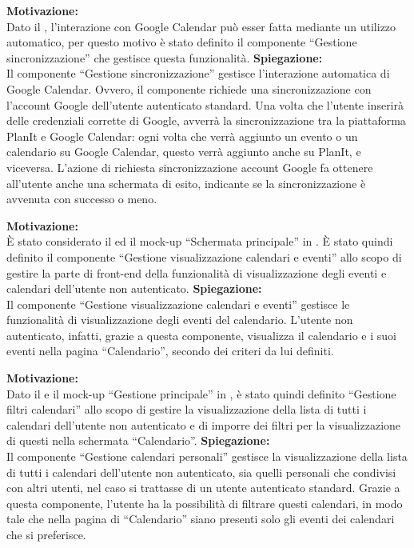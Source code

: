 \begin{listaPersonale}[ACI]{}
    \textbf{Motivazione:}\\
    Dato il , l'interazione con Google Calendar può esser fatta mediante un utilizzo automatico, per questo motivo è stato definito il componente “Gestione sincronizzazione” che gestisce questa funzionalità.
    \textbf{Spiegazione:}\\
    Il componente “Gestione sincronizzazione” gestisce l'interazione automatica di Google Calendar. Ovvero, il componente richiede una sincronizzazione con l'account Google dell'utente autenticato standard. Una volta che l'utente inserirà delle credenziali corrette di Google, avverrà la sincronizzazione tra la piattaforma PlanIt e Google Calendar: ogni volta che verrà aggiunto un evento o un calendario su Google Calendar, questo verrà aggiunto anche su PlanIt, e viceversa. L'azione di richiesta sincronizzazione account Google fa ottenere all'utente anche una schermata di esito, indicante se la sincronizzazione è avvenuta con successo o meno.



    \textbf{Motivazione:}\\
    È stato considerato il  ed il mock-up  “Schermata principale” in .
    È stato quindi definito il componente “Gestione visualizzazione calendari e eventi” allo scopo di gestire la parte di front-end della funzionalità di visualizzazione degli eventi e calendari dell'utente non autenticato.
    \textbf{Spiegazione:}\\
    Il componente “Gestione visualizzazione calendari e eventi” gestisce le funzionalità di visualizzazione degli eventi del calendario. L'utente non autenticato, infatti, grazie a questa componente, visualizza il calendario e i suoi eventi nella pagina “Calendario”, secondo dei criteri da lui definiti.



    \textbf{Motivazione:}\\
    Dato il  e il mock-up “Gestione principale” in , è stato quindi definito “Gestione filtri calendari” allo scopo di gestire la visualizzazione della lista di tutti i calendari dell'utente non autenticato e di imporre dei filtri per la visualizzazione di questi nella schermata “Calendario”.
    \textbf{Spiegazione:}\\
    Il componente “Gestione calendari personali” gestisce la visualizzazione della lista di tutti i calendari dell'utente non autenticato, sia quelli personali che condivisi con altri utenti, nel caso si trattasse di un utente autenticato standard. Grazie a questa componente, l'utente ha la possibilità di filtrare questi calendari, in modo tale che nella pagina di “Calendario” siano presenti solo gli eventi dei calendari che si preferisce.



\end{listaPersonale}
